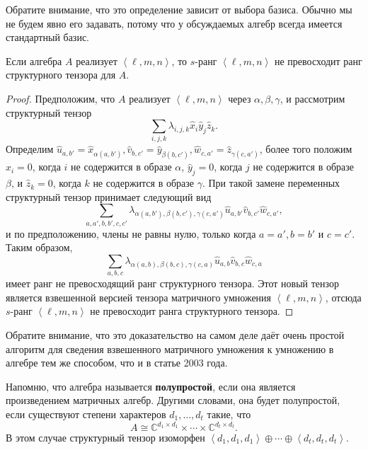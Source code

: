 Обратите внимание, что это определение зависит от выбора базиса. Обычно мы не будем явно его задавать, потому что у обсуждаемых алгебр всегда имеется стандартный базис.

\begin{prop}\label{prop:12:4.2}
   Если алгебра $A$ реализует $\left\langle \ell,m,n \right\rangle$, то $s$-ранг $\left\langle \ell,m,n \right\rangle$ не превосходит ранг структурного тензора для $A$.  
\end{prop}
\begin{proof}
   Предположим, что $A$ реализует $\left\langle \ell,m,n \right\rangle$ через $\alpha, \beta, \gamma$, и рассмотрим структурный тензор
     \[
     	\sum_{i,j,k} \lambda_{i,j,k} \widehat{x}_i \widehat{y}_j \widehat{z}_k.
     \]
   Определим $\widehat{u}_{a,b'} = \widehat{x}_{\alpha(a,b')}, \widehat{v}_{b,c'}=\widehat{y}_{\beta(b,c')}, \widehat{w}_{c,a'}=\widehat{z}_{\gamma(c,a')}$, более того положим $\widehat{x}_i=0$, когда $i$ не содержится в образе $\alpha$, $\widehat{y}_j=0$, когда $j$ не содержится в образе $\beta$, и $\widehat{z}_k=0$, когда $k$ не содержится в образе $\gamma$. При такой замене переменных структурный тензор принимает следующий вид
     \[
     	\sum_{a,a',b,b',c,c'} \lambda_{\alpha(a,b'), \beta(b,c'), \gamma(c,a')} \widehat{u}_{a,b'} \widehat{v}_{b,c'} \widehat{w}_{c,a'},
     \]
   и по предположению, члены не равны нулю, только когда $a=a', b=b'$ и $c=c'$. Таким образом,
   \[
   	\sum_{a,b,c} \lambda_{\alpha(a,b), \beta(b,c), \gamma(c,a)} \widehat{u}_{a,b} \widehat{v}_{b,c} \widehat{w}_{c,a}
   \]
   имеет ранг не превосходящий ранг структурного тензора. Этот новый тензор является взвешенной версией тензора матричного умножения $\left\langle \ell,m,n \right\rangle$, отсюда $s$-ранг $\left\langle \ell,m,n \right\rangle$ не превосходит ранга структурного тензора.
\end{proof}

Обратите внимание, что это доказательство на самом деле даёт очень простой алгоритм для сведения взвешенного матричного умножения к умножению в алгебре тем же способом, что и в статье 2003 года.

Напомню, что алгебра называется \textbf{полупростой}, если она является произведением матричных алгебр. Другими словами, она будет полупростой, если существуют степени характеров $d_1, \dotsc, d_t$ такие, что 
\[
	A \cong \mathbb{C}^{d_1 \times d_1} \times \dotsb \times \mathbb{C}^{d_t \times d_t}.
\]
В этом случае структурный тензор изоморфен $\left\langle d_1,d_1,d_1 \right\rangle \oplus \dotsb \oplus \left\langle d_t,d_t,d_t \right\rangle$.

